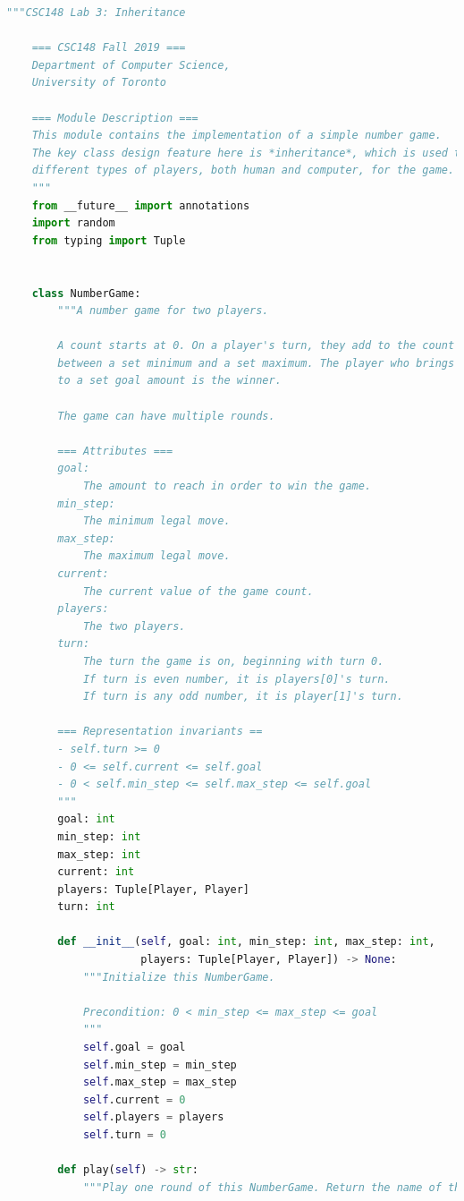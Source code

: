 \documentclass[12pt]{article}
\begin{document}
\begin{lstlisting}[language=Python,caption={lab3.py},captionpos=b]
    """CSC148 Lab 3: Inheritance

    === CSC148 Fall 2019 ===
    Department of Computer Science,
    University of Toronto

    === Module Description ===
    This module contains the implementation of a simple number game.
    The key class design feature here is *inheritance*, which is used to enable
    different types of players, both human and computer, for the game.
    """
    from __future__ import annotations
    import random
    from typing import Tuple


    class NumberGame:
        """A number game for two players.

        A count starts at 0. On a player's turn, they add to the count an amount
        between a set minimum and a set maximum. The player who brings the count
        to a set goal amount is the winner.

        The game can have multiple rounds.

        === Attributes ===
        goal:
            The amount to reach in order to win the game.
        min_step:
            The minimum legal move.
        max_step:
            The maximum legal move.
        current:
            The current value of the game count.
        players:
            The two players.
        turn:
            The turn the game is on, beginning with turn 0.
            If turn is even number, it is players[0]'s turn.
            If turn is any odd number, it is player[1]'s turn.

        === Representation invariants ==
        - self.turn >= 0
        - 0 <= self.current <= self.goal
        - 0 < self.min_step <= self.max_step <= self.goal
        """
        goal: int
        min_step: int
        max_step: int
        current: int
        players: Tuple[Player, Player]
        turn: int

        def __init__(self, goal: int, min_step: int, max_step: int,
                     players: Tuple[Player, Player]) -> None:
            """Initialize this NumberGame.

            Precondition: 0 < min_step <= max_step <= goal
            """
            self.goal = goal
            self.min_step = min_step
            self.max_step = max_step
            self.current = 0
            self.players = players
            self.turn = 0

        def play(self) -> str:
            """Play one round of this NumberGame. Return the name of the winner.


\end{lstlisting}
\end{document}
